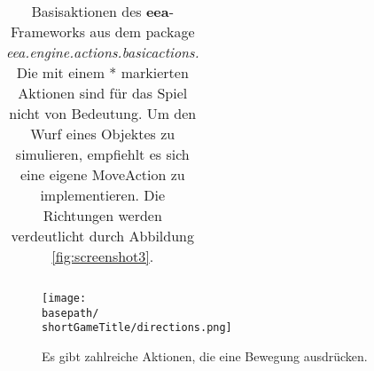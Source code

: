 \begin{table}[htbp]
\begin{tabular}{|p{}|p{}|}
\end{tabular}
\caption{Basisaktionen des \textbf{eea}-Frameworks aus dem package \emph{eea.engine.actions.basicactions.} Die mit einem * markierten Aktionen sind für das Spiel \gameTitle nicht von Bedeutung. Um den Wurf eines Objektes zu simulieren, empfiehlt es sich eine eigene MoveAction zu implementieren. Die Richtungen werden verdeutlicht durch Abbildung \vref{fig:screenshot3}.}
\end{table}

\begin{figure}[htbp]
\begin{center}
\texttt{[image: \\basepath/\\shortGameTitle/directions.png]}
\caption{Es gibt zahlreiche Aktionen, die eine Bewegung ausdrücken.}
\label{fig:screenshot3}
\end{center}
\end{figure}
